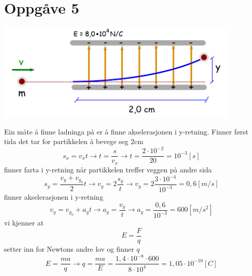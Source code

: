 \documentclass[12pt,a4paper]{article}
\begin{document}
  \section*{Oppgåve 5}
    \begin{center}
      \includegraphics[scale=0.6]{06_5.png}
    \end{center}
    Ein måte å finne ladninga på er å finne akselerasjonen i y-retning.
    Finner først tida det tar for partikkelen å bevege seg $2 \si{\centi\meter}$
    \begin{equation}
      s_x = v_x t \rightarrow t= \frac{s}{v_x} \rightarrow t = \frac{2\cdot
      10^{-2}}{20} = 10^{-3}[s]
    \end{equation}
    finner farta i y-retning når partikkelen treffer veggen på andre sida
    \begin{equation}
      s_y= \frac{v_y + v_{y_0}}{2} t \rightarrow v_y = 2\frac{s_y}{t} \rightarrow
      v_y= 2\frac{3\cdot 10^{-4}}{10^{-3}} = 0,6 [m/s]
    \end{equation}
    finner akselerasjonen i y-retning
    \begin{equation}
      v_y = v_{y_0} + a_y t \rightarrow a_y = \frac{v_y}{t} \rightarrow
      a_y = \frac{0,6}{10^{-3}} = 600[m/s^2]
    \end{equation}
    vi kjenner at 
    \begin{equation}
      E = \frac{F}{q}
    \end{equation}
    setter inn for Newtons andre lov og finner $q$
    \begin{equation}
      E = \frac{ma}{q} \rightarrow q = \frac{ma}{E} = 
      \frac{1,4\cdot 10^{-8}\cdot 600}{8\cdot 10^4} = 1,05\cdot 10^{-10}[C]
    \end{equation}
    
\end{document}
